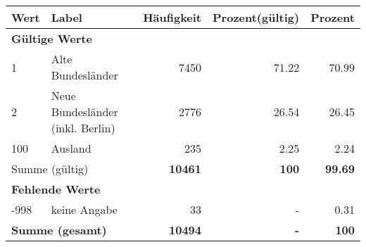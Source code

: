      \begin{longtable}{lXrrr}
     \toprule
     \textbf{Wert} & \textbf{Label} & \textbf{Häufigkeit} & \textbf{Prozent(gültig)} & \textbf{Prozent} \\
     \endhead
     \midrule
     \multicolumn{5}{l}{\textbf{Gültige Werte}}\\

     1 &
     \multicolumn{1}{X}{ Alte Bundesländer   } &


       \num{7450} &
       \num[round-mode=places,round-precision=2]{71.22} &
         \num[round-mode=places,round-precision=2]{70.99} \\

     2 &
     \multicolumn{1}{X}{ Neue Bundesländer (inkl. Berlin)   } &


       \num{2776} &
       \num[round-mode=places,round-precision=2]{26.54} &
         \num[round-mode=places,round-precision=2]{26.45} \\

     100 &
     \multicolumn{1}{X}{ Ausland   } &


       \num{235} &
       \num[round-mode=places,round-precision=2]{2.25} &
         \num[round-mode=places,round-precision=2]{2.24} \\
     \midrule
     \multicolumn{2}{l}{Summe (gültig)} &
       \textbf{\num{10461}} &
     \textbf{\num{100}} &
       \textbf{\num[round-mode=places,round-precision=2]{99.69}} \\
     \multicolumn{5}{l}{\textbf{Fehlende Werte}}\\
       -998 &
       keine Angabe &
         \num{33} &
        - &
         \num[round-mode=places,round-precision=2]{0.31} \\
     \midrule
     \multicolumn{2}{l}{\textbf{Summe (gesamt)}} &
          \textbf{\num{10494}} &
        \textbf{-} &
        \textbf{\num{100}} \\
     \bottomrule
     \end{longtable}
     
